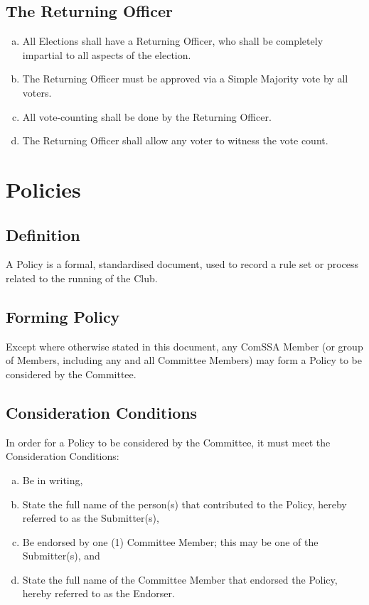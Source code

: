 \documentclass[a4paper,12pt]{article}
\begin{document}
\subsection{The Returning Officer}

\begin{enumerate}[a)]
	\item All Elections shall have a Returning Officer, who shall be completely impartial to all aspects of the election.
	\item The Returning Officer must be approved via a Simple Majority vote by all voters.
	\item All vote-counting shall be done by the Returning Officer.
	\item The Returning Officer shall allow any voter to witness the vote count.
\end{enumerate}

\section{Policies}

\subsection{Definition}

A Policy is a formal, standardised document, used to record a rule set or process related to the running of the Club.

\subsection{Forming Policy}

Except where otherwise stated in this document, any ComSSA Member (or group of Members, including any and all Committee Members) may form a Policy to be considered by the Committee.

\subsection{Consideration Conditions}

In order for a Policy to be considered by the Committee, it must meet the Consideration Conditions:

\begin{enumerate}[a)]
	\item Be in writing,
	\item State the full name of the person(s) that contributed to the Policy, hereby referred to as the Submitter(s),
	\item Be endorsed by one (1) Committee Member; this may be one of the Submitter(s), and
	\item State the full name of the Committee Member that endorsed the Policy, hereby referred to as the Endorser.
\end{enumerate}
\end{document}
